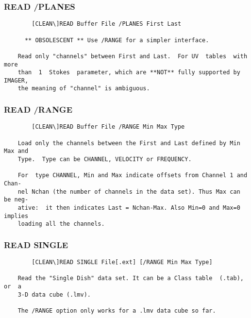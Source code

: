 \subsubsection{READ /PLANES}
\begin{verbatim}
        [CLEAN\]READ Buffer File /PLANES First Last

      ** OBSOLESCENT ** Use /RANGE for a simpler interface.

    Read only "channels" between First and Last.  For UV  tables  with  more
    than  1  Stokes  parameter, which are **NOT** fully supported by IMAGER,
    the meaning of "channel" is ambiguous.

\end{verbatim}
\subsubsection{READ /RANGE}
\begin{verbatim}
        [CLEAN\]READ Buffer File /RANGE Min Max Type

    Load only the channels between the First and Last defined by Min Max and
    Type.  Type can be CHANNEL, VELOCITY or FREQUENCY.

    For  type CHANNEL, Min and Max indicate offsets from Channel 1 and Chan-
    nel Nchan (the number of channels in the data set). Thus Max can be neg-
    ative:  it then indicates Last = Nchan-Max. Also Min=0 and Max=0 implies
    loading all the channels.

\end{verbatim}
\subsubsection{READ SINGLE}
\begin{verbatim}
        [CLEAN\]READ SINGLE File[.ext] [/RANGE Min Max Type]

    Read the "Single Dish" data set. It can be a Class table  (.tab),  or  a
    3-D data cube (.lmv).

    The /RANGE option only works for a .lmv data cube so far.


\end{verbatim}
